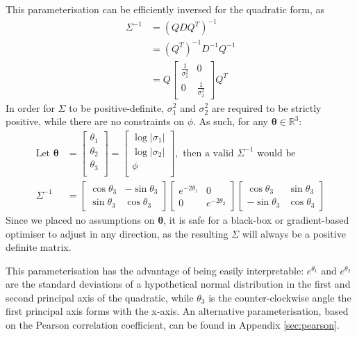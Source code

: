 \documentclass[a4paper, 12pt]{report}
\begin{document}
This parameterisation can be efficiently inversed for the quadratic form, as \begin{align}
	\Sigma^{-1} &= (QDQ^T)^{-1}\\
	&= (Q^T)^{-1} D^{-1} Q^{-1}\\
	&= Q\begin{bmatrix}
	 \frac{1}{\sigma_1^2} & 0\\ 0 &  \frac{1}{\sigma_2^2}
\end{bmatrix}Q^T
\end{align}
In order for $\Sigma$ to be positive-definite, $\sigma_1^2$ and $\sigma_2^2$ are required to be strictly positive, while there are no constraints on $\phi$. As such, for any $\boldsymbol{\theta}\in\mathbb{R}^3$:
\begin{align}
\textrm{Let }\boldsymbol{\theta}&=\begin{bmatrix}
	\theta_1\\
	\theta_2\\
	\theta_3\\
\end{bmatrix}=\begin{bmatrix}
	\log|\sigma_1| \\
	\log|\sigma_2|\\
	\phi\\
\end{bmatrix}, \textrm{ then a valid $\Sigma^{-1}$ would be} \\
\Sigma^{-1} &= \begin{bmatrix}
	\cos \theta_3 & -\sin \theta_3 \\ \sin\theta_3 & \cos\theta_3
\end{bmatrix}\begin{bmatrix}
	 e^{-2\theta_1} & 0\\ 0 &  e^{-2\theta_2}
\end{bmatrix} \begin{bmatrix}
	\cos \theta_3 & \sin \theta_3 \\ -\sin\theta_3 & \cos\theta_3
\end{bmatrix}
\end{align}
Since we placed no assumptions on $\boldsymbol{\theta}$, it is safe for a black-box or gradient-based optimiser to adjust in any direction, as the resulting $\Sigma$ will always be a positive definite matrix.

This parameterisation has the advantage of being easily interpretable: $e^{\theta_1}$ and $e^{\theta_2}$ are the standard deviations of a hypothetical normal distribution in the first and second principal axis of the quadratic, while $\theta_3$ is the counter-clockwise angle the first principal axis forms with the x-axis. An alternative parameterisation, based on the Pearson correlation coefficient, can be found in Appendix \ref{sec:pearson}.
\end{document}

